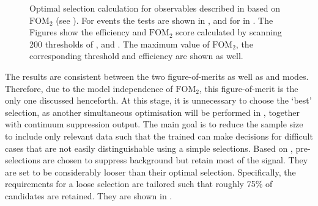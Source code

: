 \begin{figure}[htbp!]
{        }
    \caption{\label{fig:selection_optimisations} Optimal selection calculation for observables
    described in  based on $\mathrm{FOM}_2$ (see ).
    For \BptoXsgamma events the tests are shown
    in ,
    and for \BztoXsgamma in .
    The Figures show the efficiency and $\mathrm{FOM}_2$ score calculated by scanning 200 thresholds of \piVeto, \etaVeto and \ZMVA.
    The maximum value of $\mathrm{FOM}_2$, the corresponding threshold and efficiency are shown as well.
    }
\end{figure}

The results are consistent between the two figure-of-merits as well as \Bp and \Bz modes.
Therefore, due to the model independence of $\mathrm{FOM}_2$, this figure-of-merit is the only one discussed henceforth.
At this stage, it is unnecessary to choose the `best' selection, 
as another simultaneous optimisation will be performed  in , together with continuum suppression \BDT output.
The main goal is to reduce the sample size to include only relevant data such that the trained \BDT can make decisions for difficult cases that are not easily distinguishable using a simple selections.
Based on , pre-selections are chosen to suppress background but retain most of the signal.
They are set to be considerably looser than their optimal selection.
Specifically, the requirements for a loose selection are tailored such that roughly 75\% of \BtoXsgamma candidates are retained.
They are shown in .

